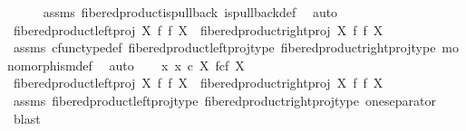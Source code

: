 \begin{isabellebody}
\ \ \ \ \isamarkupfalse%
\ assms\ fibered{\isacharunderscore}{\kern0pt}product{\isacharunderscore}{\kern0pt}is{\isacharunderscore}{\kern0pt}pullback\ is{\isacharunderscore}{\kern0pt}pullback{\isacharunderscore}{\kern0pt}def\ \isamarkupfalse%
\ auto\isanewline
\ \ \isamarkupfalse%
\ \isamarkupfalse%
\ {\isachardoublequoteopen}{\isacharparenleft}{\kern0pt}fibered{\isacharunderscore}{\kern0pt}product{\isacharunderscore}{\kern0pt}left{\isacharunderscore}{\kern0pt}proj\ X\ f\ f\ X{\isacharparenright}{\kern0pt}\ {\isacharequal}{\kern0pt}\ {\isacharparenleft}{\kern0pt}fibered{\isacharunderscore}{\kern0pt}product{\isacharunderscore}{\kern0pt}right{\isacharunderscore}{\kern0pt}proj\ X\ f\ f\ X{\isacharparenright}{\kern0pt}{\isachardoublequoteclose}\isanewline
\ \ \ \ \isamarkupfalse%
\ assms\ cfunc{\isacharunderscore}{\kern0pt}type{\isacharunderscore}{\kern0pt}def\ fibered{\isacharunderscore}{\kern0pt}product{\isacharunderscore}{\kern0pt}left{\isacharunderscore}{\kern0pt}proj{\isacharunderscore}{\kern0pt}type\ fibered{\isacharunderscore}{\kern0pt}product{\isacharunderscore}{\kern0pt}right{\isacharunderscore}{\kern0pt}proj{\isacharunderscore}{\kern0pt}type\ monomorphism{\isacharunderscore}{\kern0pt}def\ \isamarkupfalse%
\ auto\isanewline
{}\isamarkupfalse%
\isanewline
\ \ \isamarkupfalse%
\ {\isachardoublequoteopen}{\isasymnexists}x{\isachardot}{\kern0pt}\ x\ {\isasymin}\isactrlsub c\ X\ \isactrlbsub f\isactrlesub {\isasymtimes}\isactrlsub c\isactrlbsub f\isactrlesub \ X{\isachardoublequoteclose}\isanewline
\ \ \isamarkupfalse%
\ \isamarkupfalse%
\ {\isachardoublequoteopen}fibered{\isacharunderscore}{\kern0pt}product{\isacharunderscore}{\kern0pt}left{\isacharunderscore}{\kern0pt}proj\ X\ f\ f\ X\ {\isacharequal}{\kern0pt}\ fibered{\isacharunderscore}{\kern0pt}product{\isacharunderscore}{\kern0pt}right{\isacharunderscore}{\kern0pt}proj\ X\ f\ f\ X{\isachardoublequoteclose}\isanewline
\ \ \ \ \isamarkupfalse%
\ assms\ fibered{\isacharunderscore}{\kern0pt}product{\isacharunderscore}{\kern0pt}left{\isacharunderscore}{\kern0pt}proj{\isacharunderscore}{\kern0pt}type\ fibered{\isacharunderscore}{\kern0pt}product{\isacharunderscore}{\kern0pt}right{\isacharunderscore}{\kern0pt}proj{\isacharunderscore}{\kern0pt}type\ one{\isacharunderscore}{\kern0pt}separator\ \isamarkupfalse%
\ blast\isanewline
{}\isamarkupfalse%
%
\endisatagproof
{\isafoldproof}%
%
\isadelimproof

\end{isabellebody}
